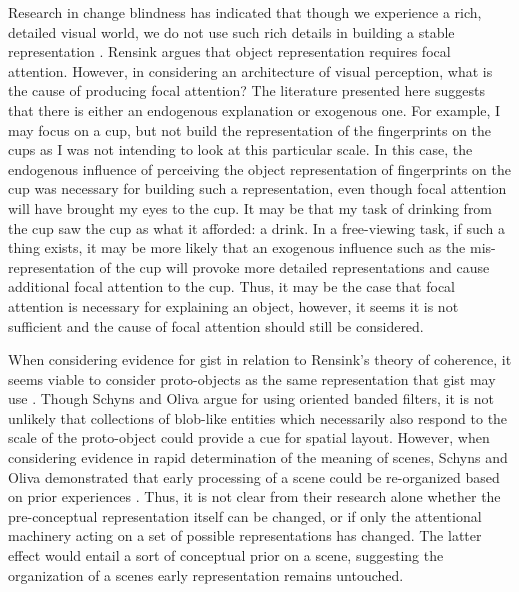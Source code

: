 Research in change blindness has indicated that though we experience a rich, detailed visual world, we do not use such rich details in building a stable representation \cite{Simons1997}.  Rensink argues that object representation requires focal attention.  However, in considering an architecture of visual perception, what is the cause of producing focal attention?  The literature presented here suggests that there is either an endogenous explanation or exogenous one.  For example, I may focus on a cup, but not build the representation of the fingerprints on the cups as I was not intending to look at this particular scale.  In this case, the endogenous influence of perceiving the object representation of fingerprints on the cup was necessary for building such a representation, even though focal attention will have brought my eyes to the cup.  It may be that my task of drinking from the cup saw the cup as what it afforded: a drink.  In a free-viewing task, if such a thing exists, it may be more likely that an exogenous influence such as the mis-representation of the cup will provoke more detailed representations and cause additional focal attention to the cup.  Thus, it may be the case that focal attention is necessary for explaining an object, however, it seems it is not sufficient and the cause of focal attention should still be considered.  

When considering evidence for gist in relation to Rensink's theory of coherence, it seems viable to consider proto-objects as the same representation that gist may use \cite{Rensink2002}.  Though Schyns and Oliva argue for using oriented banded filters, it is not unlikely that collections of blob-like entities which necessarily also respond to the scale of the proto-object could provide a cue for spatial layout.   However, when considering evidence in rapid determination of the meaning of scenes, Schyns and Oliva demonstrated that early processing of a scene could be re-organized based on prior experiences \cite{Schyns1994,Oliva1997}.  Thus, it is not clear from their research alone whether the pre-conceptual representation itself can be changed, or if only the attentional machinery acting on a set of possible representations has changed.  The latter effect would entail a sort of conceptual prior on a scene, suggesting the organization of a scenes early representation remains untouched.

